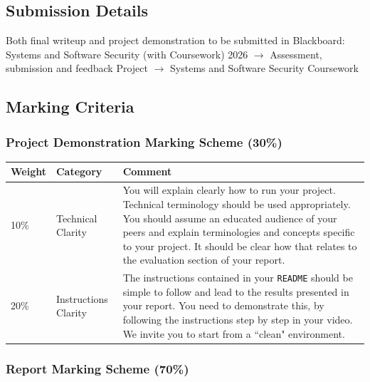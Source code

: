 \documentclass{article}
\newcommand\cwyear[0]{2026}
\begin{document}
\subsection*{Submission Details}

Both final writeup and project
demonstration to be submitted in Blackboard: Systems and Software
Security (with Coursework) \cwyear{} $\rightarrow$
Assessment, submission and feedback Project
$\rightarrow$ Systems and Software Security Coursework

\subsection*{Marking Criteria}

\subsubsection*{Project Demonstration Marking Scheme (30\%)}

\begin{tabularx}{\linewidth}{llX}
  \toprule
  Weight & Category & Comment \\
  \midrule
  10\% & Technical Clarity & You will explain clearly how to run your
                             project. Technical terminology should be used appropriately. You should
                             assume an educated audience of your peers and explain terminologies and
                             concepts specific to your project. It should be clear how that relates
                             to the evaluation section of your report. \\
  20\% & Instructions Clarity & The instructions contained in your \texttt{README}
                                should be simple to follow and lead to the results presented in your
                                report. You need to demonstrate this, by following the instructions step
                                by step in your video. We invite you to start from a ``clean"
                                environment. \\
  \bottomrule
\end{tabularx}

\subsubsection*{Report Marking Scheme (70\%)}
\end{document}

